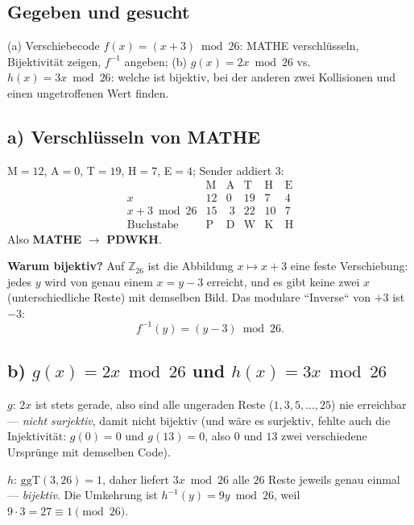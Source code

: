 

\subsection*{Gegeben und gesucht}
(a) Verschiebecode $f(x)=(x+3)\bmod26$: MATHE verschl\"usseln,
Bijektivit\"at zeigen, $f^{-1}$ angeben; (b) $g(x)=2x\bmod26$ vs.\
$h(x)=3x\bmod26$: welche ist bijektiv, bei der anderen zwei Kollisionen
und einen ungetroffenen Wert finden.

\subsection*{a) Verschl\"usseln von MATHE}
M$=12$, A$=0$, T$=19$, H$=7$, E$=4$; Sender addiert $3$:
\begin{equation}
  \begin{array}{c|ccccc}
   &\mathrm M&\!\mathrm A&\!\mathrm T&\!\mathrm H&\!\mathrm E\\[-1pt]
   x & 12&0&19&7&4\\
   x+3\bmod26 & 15&\;3&22&10&7\\
   \text{Buchstabe} & \mathrm P&\mathrm D&\mathrm W&\mathrm K&\mathrm H
  \end{array}
\end{equation}
Also \textbf{MATHE} $\to$ \textbf{PDWKH}.

\textbf{Warum bijektiv?} Auf $\mathbb Z_{26}$ ist die Abbildung
$x\mapsto x+3$ eine feste Verschiebung: jedes $y$ wird von genau einem
$x=y-3$ erreicht, und es gibt keine zwei $x$ (unterschiedliche Reste)
mit demselben Bild. Das modulare ``Inverse`` von $+3$ ist $-3$:
\begin{equation}
  f^{-1}(y)=(y-3)\bmod26 .
\end{equation}

\subsection*{b) $g(x)=2x\bmod26$ und $h(x)=3x\bmod26$}
$g$: $2x$ ist stets gerade, also sind alle ungeraden Reste
($1,3,5,\dots,25$) nie erreichbar --- \emph{nicht surjektiv}, damit
nicht bijektiv (und w\"are es surjektiv, fehlte auch die Injektivit\"at:
$g(0)=0$ und $g(13)=0$, also $0$ und $13$ zwei verschiedene Urspr\"unge
mit demselben Code).

$h$: $\mathrm{ggT}(3,26)=1$, daher liefert $3x\bmod26$ alle $26$ Reste
jeweils genau einmal --- \emph{bijektiv}. Die Umkehrung ist
$h^{-1}(y)=9y\bmod26$, weil $9\cdot3=27\equiv1\pmod{26}$.

